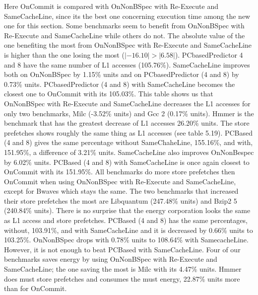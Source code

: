 Here OnCommit is compared with OnNonBSpec with Re-Execute and SameCacheLine, since its the best one concerning execution time among the new one for
this section. Some benchmarks seem to benefit from OnNonBSpec with Re-Execute and SameCacheLine while others do not. The absolute value of the one benefiting
the most from OnNonBSpec with Re-Execute and SameCacheLine is higher than the
one losing the most ($|-16.10| > |6.58|$).
\resAcc
{}
PCbasedPredictor 4 and 8 have the same number of L1 accesses (105.76\%). SameCacheLine improves both on OnNonBSpec by 1.15\% units and on PCbasedPredictor (4 and 8) by 0.73\% units. PCbasedPredictor (4 and 8) with SameCacheLine
becomes the closest one to OnCommit with its 105.03\%.
This table shows us that OnNonBSpec with Re-Execute and SameCacheLine decreases the L1 accesses for only two benchmarks, Milc (-3.52\% units) and Gcc 2 (0.17\% units). Hmmer is the benchmark that has the greatest decrease of L1 accesses
26.20\% units.
\resSp
{}
The store prefetches shows roughly the same thing as L1 accesses (see table 5.19).
PCBased (4 and 8) gives the same percentage without SameChaheLine, 155.16\%,
and with, 151.95\%, a difference of 3.21\% units. SameCacheLine also improves OnNonBespec by 6.02\% units. PCBased (4 and 8) with SameCacheLine is once again
closest to OnCommit with its 151.95\%.
All benchmarks do more store prefetches then OnCommit when using OnNonBSpec with Re-Execute and SameCacheLine, except for Bwaves which stays the same.
The two benchmarks that increased their store prefetches the most are Libquantum
(247.48\% units) and Bzip2 5 (240.84\% units).
\resEnergy
{}
There is no surprise that the energy corporation looks the same as L1 access and
store prefetches. PCBased (4 and 8) has the same percentages, without, 103.91\%,
and with SameCacheLine and it is decreased by 0.66\% units to 103.25\%. OnNonBSpec drops with 0.78\% units to 108.64\% with SamecacheLine. However, it is not
enough to beat PCBased with SameCacheLine.
 Four of our benchmarks saves energy by using OnNonBSpec with Re-Execute and
SameCacheLine; the one saving the most is Milc with its 4.47\% units. Hmmer does 
must store prefetches and consumes the must energy, 22.87\% units more than for
OnCommit.
